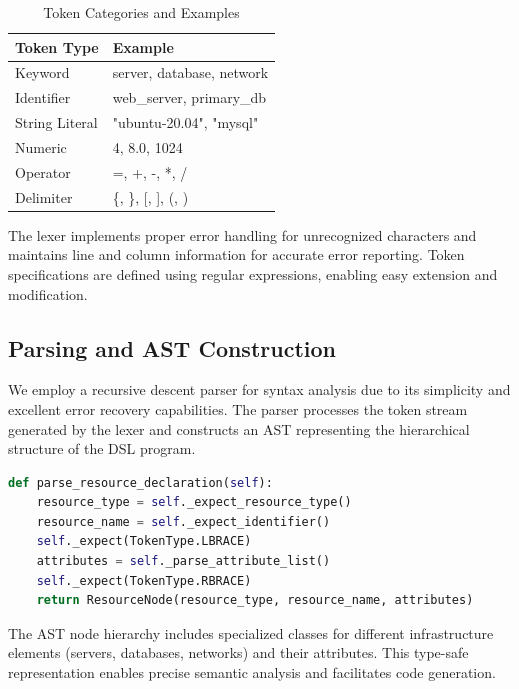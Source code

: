 \documentclass[journal,twocolumn,10pt]{IEEEtran}
\begin{document}
\begin{table}[ht]
    \centering
    \caption{Token Categories and Examples}
    \label{tab:tokens}
    \begin{tabular}{ll}
        \toprule
        Token Type & Example \\
        \midrule
        Keyword & server, database, network \\
        Identifier & web\_server, primary\_db \\
        String Literal & "ubuntu-20.04", "mysql" \\
        Numeric & 4, 8.0, 1024 \\
        Operator & =, +, -, *, / \\
        Delimiter & \{, \}, [, ], (, ) \\
        \bottomrule
    \end{tabular}
\end{table}

The lexer implements proper error handling for unrecognized characters and maintains line and column information for accurate error reporting. Token specifications are defined using regular expressions, enabling easy extension and modification.

\subsection{Parsing and AST Construction}

We employ a recursive descent parser for syntax analysis due to its simplicity and excellent error recovery capabilities. The parser processes the token stream generated by the lexer and constructs an AST representing the hierarchical structure of the DSL program.

\begin{lstlisting}[language=Python, caption=Parser Structure Example]
def parse_resource_declaration(self):
    resource_type = self._expect_resource_type()
    resource_name = self._expect_identifier()
    self._expect(TokenType.LBRACE)
    attributes = self._parse_attribute_list()
    self._expect(TokenType.RBRACE)
    return ResourceNode(resource_type, resource_name, attributes)
\end{lstlisting}

The AST node hierarchy includes specialized classes for different infrastructure elements (servers, databases, networks) and their attributes. This type-safe representation enables precise semantic analysis and facilitates code generation.
\end{document}
